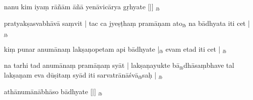 \documentclass[article,12pt,a4paper]{memoir}%
\newcounter{parCount}
\begin{document}
	  
	  \pstart \leavevmode%
	nanu kim iyaṃ rāñām āñā yenāvicārya gṛhyate [|]
	{}
	\pend%
      {\tiny $_{lb}$}

	  
	  \pstart \leavevmode%
	pratyakṣasvabhāvā saṃvit | tac ca jyeṣṭhaṃ pramāṇam ato{\tiny $_{lb}$} na bādhyata iti cet |
	{}
	\pend%
      {\tiny $_{lb}$}

	  
	  \pstart \leavevmode%
	kiṃ punar anumānaṃ lakṣaṇopetam api bādhyate |{\tiny $_{lb}$} evam etad iti cet |
	{}
	\pend%
      {\tiny $_{lb}$}

	  
	  \pstart \leavevmode%
	na tarhi tad anumānaṃ pramāṇaṃ syāt | lakṣaṇayukte bā{\tiny $_{lb}$}dhāsaṃbhave tal lakṣaṇam eva dūṣitaṃ syād iti sarvatrānāśvā{\tiny $_{lb}$}saḥ |
	{}
	\pend%
      {\tiny $_{lb}$}

	  
	  \pstart \leavevmode%
	athānumānābhāso bādhyate [|]
	{}
	\pend%
      {\tiny $_{lb}$}
\end{document}
